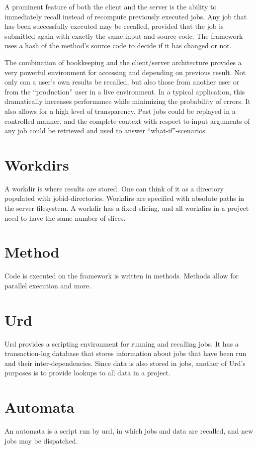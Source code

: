 A prominent feature of both the client and the server is the ability
to immediately recall instead of recompute previously executed jobs.
Any job that has been successfully executed may be recalled, provided
that the job is submitted again with exactly the same input and source
code.  The framework uses a hash of the method's source code to decide
if it has changed or not.

The combination of bookkeeping and the client/server architecture
provides a very powerful environment for accessing and depending on
previous result.  Not only can a user's own results be recalled, but
also those from another user or from the ``production'' user in a live
environment.  In a typical application, this dramatically increases
performance while minimizing the probability of errors.  It also
allows for a high level of transparency.  Past jobs could be replayed
in a controlled manner, and the complete context with respect to input
arguments of any job could be retrieved and used to answer
``what-if''-scenarios.




\section{Workdirs}

A workdir is where results are stored.  One can think of it as a
directory populated with jobid-directories.  Workdirs are specified
with absolute paths in the server filesystem.  A workdir has a fixed
slicing, and all workdirs in a project need to have the same number of
slices.


\section{Method}

Code is executed on the framework is written in methods.  Methods
allow for parallel execution and more.



\section{Urd}

Urd provides a scripting environment for running and recalling jobs.
It has a transaction-log database that stores information about jobs
that have been run and their inter-dependencies.  Since data is also
stored in jobs, another of Urd's purposes is to provide lookups to all
data in a project.



\section{Automata}

An automata is a script run by urd, in which jobs and data are
recalled, and new jobs may be dispatched.
